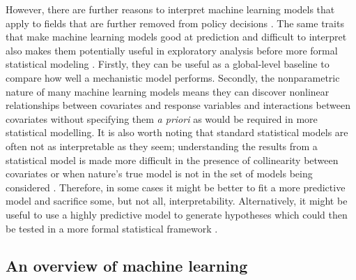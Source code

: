 \documentclass[12pt,]{article}
\begin{document}
However, there are further reasons to interpret machine learning models that apply to fields that are further removed from policy decisions \citep{elith2009species}.
The same traits that make machine learning models good at prediction and difficult to interpret also makes them potentially useful in exploratory analysis before more formal statistical modeling \citep{zhao2017causal, gelman2014statistical, nosek2012scientific}.
Firstly, they can be useful as a global-level baseline to compare how well a mechanistic model performs.
Secondly, the nonparametric nature of many machine learning models means they can discover nonlinear relationships between covariates and response variables and interactions between covariates without specifying them \emph{a priori} as would be required in more statistical modelling.
It is also worth noting that standard statistical models are often not as interpretable as they seem; understanding the results from a statistical model is made more difficult in the presence of collinearity between covariates or when nature's true model is not in the set of models being considered \citep{lyddon2018nonparametric, yao2017using}.
Therefore, in some cases it might be better to fit a more predictive model and sacrifice some, but not all, interpretability.
Alternatively, it might be useful to use a highly predictive model to generate hypotheses which could then be tested in a more formal statistical framework \citep{zhao2017causal}.


\subsection{An overview of machine learning}\label{an-overview-of-machine-learning}
\end{document}
